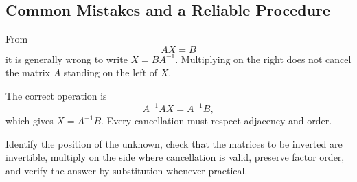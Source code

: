 \subsection{Common Mistakes and a Reliable Procedure}

From
\[
AX=B
\]
it is generally wrong to write $X=BA^{-1}$. Multiplying on the right does not cancel the matrix $A$ standing on the left of $X$.

\begin{remarkbox}
The correct operation is
\[
A^{-1}AX=A^{-1}B,
\]
which gives $X=A^{-1}B$. Every cancellation must respect adjacency and order.
\end{remarkbox}

\begin{summarybox}
Identify the position of the unknown, check that the matrices to be inverted are invertible, multiply on the side where cancellation is valid, preserve factor order, and verify the answer by substitution whenever practical.
\end{summarybox}
